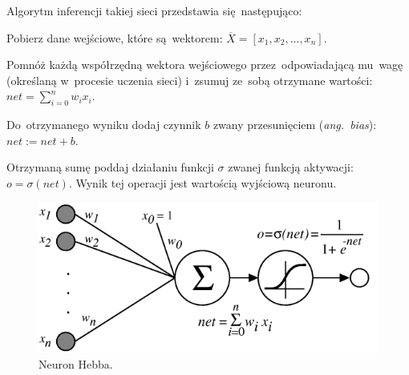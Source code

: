 \documentclass[oneside, 11pt, a4paper]{article}
\begin{document}
\begin{multicols}{2}
\begin{minipage}{\linewidth}
Algorytm inferencji takiej sieci przedstawia się~następująco:
\begin{compactenum}
	\item Pobierz dane wejściowe, które są~wektorem: $\overline{X}=[x_1, x_2, ..., x_n]$.
	\item Pomnóż każdą współrzędną wektora wejściowego przez~odpowiadającą mu~wagę (określaną w~procesie uczenia sieci) i~zsumuj ze~sobą otrzymane wartości: $net = \sum\limits_{i=0}^{n} w_i x_i$.
	\item Do~otrzymanego wyniku dodaj czynnik $b$ zwany przesunięciem (\textit{ang.~bias}): $net := net + b$.
	\item Otrzymaną sumę poddaj działaniu funkcji $\sigma$ zwanej funkcją aktywacji: \mbox{$o=\sigma(net)$}. Wynik tej operacji jest wartością wyjściową neuronu.
\end{compactenum}
\vspace{-0.2cm}
\begin{figure}[H]
	\includegraphics[width=0.9\linewidth, keepaspectratio]{img/sigmoid-neuron.png}
	\vspace{-2mm}
	\caption{Neuron Hebba.}
	\label{fig:hebb-neuron}
\end{figure}
\vfill
\end{minipage}
\vspace{-0.6cm}
\begin{figure}[H]
	\centering

\end{figure}
\end{multicols}
\end{document}
